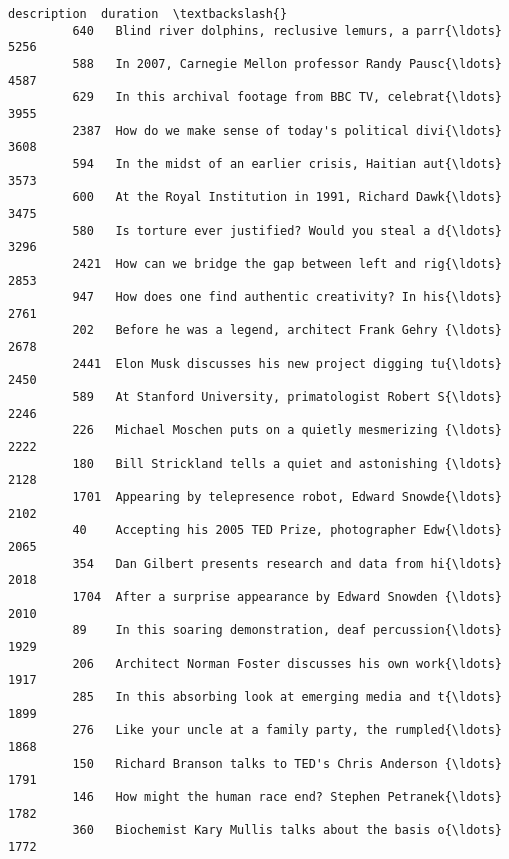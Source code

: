 \documentclass[11pt]{article}
\begin{document}
\begin{Verbatim}[commandchars=\\\{\}]
                                                     description  duration  \textbackslash{}
         640   Blind river dolphins, reclusive lemurs, a parr{\ldots}      5256   
         588   In 2007, Carnegie Mellon professor Randy Pausc{\ldots}      4587   
         629   In this archival footage from BBC TV, celebrat{\ldots}      3955   
         2387  How do we make sense of today's political divi{\ldots}      3608   
         594   In the midst of an earlier crisis, Haitian aut{\ldots}      3573   
         600   At the Royal Institution in 1991, Richard Dawk{\ldots}      3475   
         580   Is torture ever justified? Would you steal a d{\ldots}      3296   
         2421  How can we bridge the gap between left and rig{\ldots}      2853   
         947   How does one find authentic creativity? In his{\ldots}      2761   
         202   Before he was a legend, architect Frank Gehry {\ldots}      2678   
         2441  Elon Musk discusses his new project digging tu{\ldots}      2450   
         589   At Stanford University, primatologist Robert S{\ldots}      2246   
         226   Michael Moschen puts on a quietly mesmerizing {\ldots}      2222   
         180   Bill Strickland tells a quiet and astonishing {\ldots}      2128   
         1701  Appearing by telepresence robot, Edward Snowde{\ldots}      2102   
         40    Accepting his 2005 TED Prize, photographer Edw{\ldots}      2065   
         354   Dan Gilbert presents research and data from hi{\ldots}      2018   
         1704  After a surprise appearance by Edward Snowden {\ldots}      2010   
         89    In this soaring demonstration, deaf percussion{\ldots}      1929   
         206   Architect Norman Foster discusses his own work{\ldots}      1917   
         285   In this absorbing look at emerging media and t{\ldots}      1899   
         276   Like your uncle at a family party, the rumpled{\ldots}      1868   
         150   Richard Branson talks to TED's Chris Anderson {\ldots}      1791   
         146   How might the human race end? Stephen Petranek{\ldots}      1782   
         360   Biochemist Kary Mullis talks about the basis o{\ldots}      1772   
         

\end{Verbatim}
\end{document}
